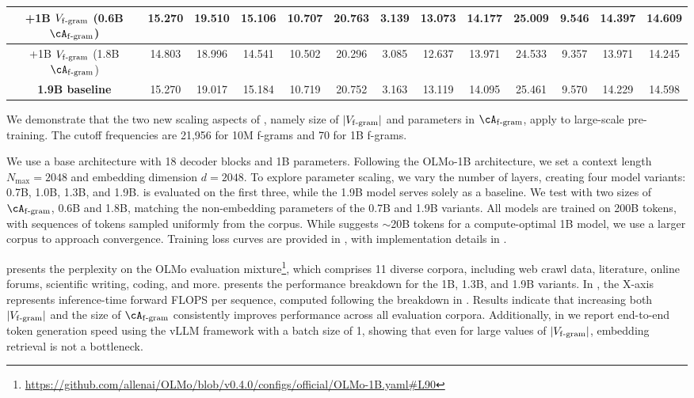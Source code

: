 \begin{table*}[htbp]
{\begin{tabular}{c|cccccccccccc}
  \midrule
  +1B $V_{\mathrm{f\text{-}gram}}$ (0.6B $\Afgram$) & 15.270 &  19.510 & 15.106 & 10.707 & 20.763 &  3.139 & 13.073  & 14.177  &  25.009 & 9.546   & 14.397  & 14.609 \\
  \midrule
  +1B $V_{\mathrm{f\text{-}gram}}$ (1.8B $\Afgram$) & 14.803&  18.996 & 14.541 & 10.502 & 20.296 &  3.085 & 12.637  & 13.971  &  24.533 & 9.357   & 13.971  & 14.245 \\
  \midrule
  \midrule
  \textbf{1.9B baseline} & 15.270 &  19.017 & 15.184 & 10.719 & 20.752 &  3.163 & 13.119  & 14.095  &  25.461 & 9.570   & 14.229  & 14.598 \\
\bottomrule
\end{tabular}
}
\end{table*}


We demonstrate that the two new scaling aspects of \SCONE, namely size of $|V_{\mathrm{f\text{-}gram}}|$ and parameters in $\Afgram$, apply to large-scale pre-training. The cutoff frequencies are 21,956 for 10M f-grams and 70 for 1B f-grams.

We use a base architecture with 18 decoder blocks and 1B parameters. Following the OLMo-1B architecture, we set a context length $N_{\max} = 2048$
and embedding dimension $d=2048$. To explore parameter scaling, we vary the number of layers, creating four model variants: 0.7B, 1.0B, 1.3B, and 1.9B. \SCONE is evaluated on the first three, while the 1.9B model serves solely as a baseline. We test \SCONE with two sizes of $\Afgram$, 0.6B and 1.8B, matching the non-embedding parameters of the 0.7B and 1.9B variants. All models are trained on 200B tokens, with sequences of tokens sampled uniformly from the corpus. While \citet{hoffmann2022training} suggests $\sim$20B tokens for a compute-optimal 1B model, we use a larger corpus to approach convergence. Training loss curves are provided in , with implementation details in .



 presents the perplexity on the OLMo evaluation mixture\footnote{\url{https://github.com/allenai/OLMo/blob/v0.4.0/configs/official/OLMo-1B.yaml\#L90}}, which comprises 11 diverse corpora, including web crawl data, literature, online forums, scientific writing, coding, and more.  presents the performance breakdown for the 1B, 1.3B, and 1.9B variants. In , the X-axis represents inference-time forward FLOPS per sequence, computed following the breakdown in \citet{hoffmann2022training}. Results indicate that increasing both $|V_{\mathrm{f\text{-}gram}}|$ and the size of $\Afgram$ consistently  improves performance across all evaluation corpora. Additionally, in  we report end-to-end token generation speed using  the vLLM framework \citep{kwon2023efficient} with a batch size of 1, showing that even for large values of $|V_{\mathrm{f\text{-}gram}}|$, embedding retrieval is not a bottleneck.


